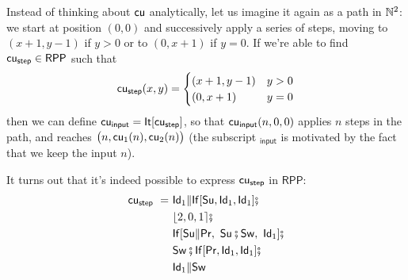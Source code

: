 \documentclass[runningheads]{llncs}
\newcommand{\RPP}{\textsf{RPP}\xspace}
\begin{document}
Instead of thinking about $\mathsf{cu}$ analytically, let us imagine it again as a path in $\mathbb{N}^2$:
we start at position $(0, 0)$ and successively apply a series of steps,
moving to $(x+1,y-1)$ if $y > 0$ or to $(0, x+1)$ if $y = 0$.
If we're able to find $\rppcustep \in \RPP$ such that
\[ \mathsf{cu_{step}}(x,y) = \begin{cases} (x+1,y-1) &  y > 0 \\
    (0, x+1) &   y = 0 \end{cases} \]
then we can define $\mathsf{cu_{input}} = \mathsf{It}[\mathsf{cu_{step}}]$, so that $\mathsf{cu_{input}}(n, 0, 0)$ applies $n$ steps in the path, and reaches $\big( n, \mathsf{cu}_1(n), \mathsf{cu}_2(n) \big)$
(the subscript $\mathsf{_{input}}$ is motivated by the fact that we keep the input $n$).

It turns out that it's indeed possible to express $\mathsf{cu_{step}}$ in $\RPP$:
\begin{align*}
    \rppcustep \ = \ & \rppId_1 \rppPa \rppIf[\rppSu, \rppId_1, \rppId_1] \rppCo \\
    & \rpprewire{2, 0, 1} \rppCo \\
    & \rppIf[\rppSu \rppPa \rppPr , \ \rppSu \rppCo \rppSw, \ \rppId_1] \rppCo \\
    & \rppSw \rppCo \rppIf[\rppPr, \rppId_1, \rppId_1] \rppCo \\
    & \rppId_1 \rppPa \rppSw
\end{align*}
\end{document}
